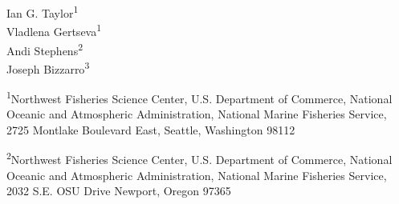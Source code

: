 
\begin{center}
\thispagestyle{empty}

\vspace{.7cm}


\vspace{.5cm}

Ian G. Taylor\textsuperscript{1}\\
Vladlena Gertseva\textsuperscript{1}\\
Andi Stephens\textsuperscript{2}\\
Joseph Bizzarro\textsuperscript{3}\\

\vspace{.7cm}

\small

\textsuperscript{1}Northwest Fisheries Science Center, U.S. Department of Commerce, National Oceanic and Atmospheric Administration, National Marine Fisheries Service, 2725 Montlake Boulevard East, Seattle, Washington 98112\\

\vspace{.3cm}

\textsuperscript{2}Northwest Fisheries Science Center, U.S. Department of Commerce, National Oceanic and Atmospheric Administration, National Marine Fisheries Service, 2032 S.E. OSU Drive Newport, Oregon 97365

\vspace{.3cm}


\end{center}
